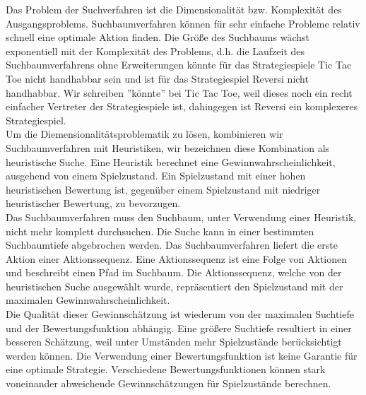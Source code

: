 Das Problem der Suchverfahren ist die Dimensionalität bzw. Komplexität des Ausgangsproblems. Suchbaumverfahren können für sehr einfache Probleme relativ schnell eine optimale Aktion finden. Die Größe des Suchbaums wächst exponentiell mit der Komplexität des Problems, d.h. die Laufzeit des Suchbaumverfahrens ohne Erweiterungen könnte für das Strategiespiele Tic Tac Toe nicht handhabbar sein und ist für das Strategiespiel Reversi nicht handhabbar. Wir schreiben ''könnte'' bei Tic Tac Toe, weil dieses noch ein recht einfacher Vertreter der Strategiespiele ist, dahingegen ist Reversi ein komplexeres Strategiespiel. \\

Um die Diemensionalitätsproblematik zu lösen, kombinieren wir Suchbaumverfahren mit Heuristiken, wir bezeichnen diese Kombination als heuristische Suche. Eine Heuristik berechnet eine Gewinnwahrscheinlichkeit, ausgehend von einem Spielzustand. Ein Spielzustand mit einer hohen heuristischen Bewertung ist, gegenüber einem Spielzustand mit niedriger heuristischer Bewertung, zu bevorzugen. \\

Das Suchbaumverfahren muss den Suchbaum, unter Verwendung einer Heuristik, nicht mehr komplett durchsuchen. Die Suche kann in einer bestimmten Suchbaumtiefe abgebrochen werden. Das Suchbaumverfahren liefert die erste Aktion einer Aktionssequenz. Eine Aktionssequenz ist eine Folge von Aktionen und beschreibt einen Pfad im Suchbaum. Die Aktionssequenz, welche von der heuristischen Suche ausgewählt wurde, repräsentiert den Spielzustand mit der maximalen Gewinnwahrscheinlichkeit. \\

Die Qualität dieser Gewinnschätzung ist wiederum von der maximalen Suchtiefe und der Bewertungsfunktion abhängig. Eine größere Suchtiefe resultiert in einer besseren Schätzung, weil unter Umständen mehr Spielzustände berücksichtigt werden können. Die Verwendung einer Bewertungsfunktion ist keine Garantie für eine optimale Strategie. Verschiedene Bewertungsfunktionen können stark voneinander abweichende Gewinnschätzungen für Spielzustände berechnen. \\

